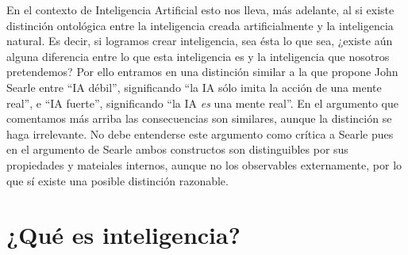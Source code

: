 \documentclass[12pt]{memoir}
\begin{document}
En el contexto de Inteligencia Artificial esto nos lleva, más adelante, al si existe distinción ontológica entre la inteligencia creada artificialmente y la inteligencia natural. Es decir, si logramos crear inteligencia, sea ésta lo que sea, ¿existe aún alguna diferencia entre lo que esta inteligencia es y la inteligencia que nosotros pretendemos? Por ello entramos en una distinción similar a la que propone John Searle entre ``IA débil'', significando ``la IA sólo imita la acción de una mente real'', e ``IA fuerte'', significando ``la IA \textit{es} una mente real''. En el argumento que comentamos más arriba las consecuencias son similares, aunque la distinción se haga irrelevante. No debe entenderse este argumento como crítica a Searle pues en el argumento de Searle ambos constructos son distinguibles por sus propiedades y mateiales internos, aunque no los observables externamente, por lo que sí existe una posible distinción razonable.

\section{¿Qué es inteligencia?}

\nocite{intDefs}

\newpage

\printbibliography
\end{document}
